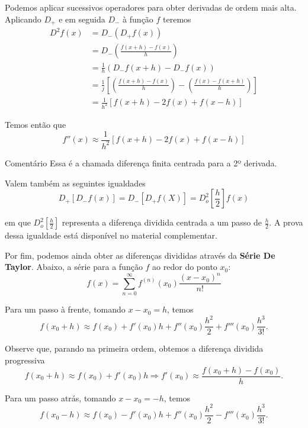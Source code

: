 \documentclass[12pt,openany]{book}
\begin{document}
Podemos aplicar sucessivos operadores para obter derivadas de ordem mais alta.
Aplicando $D_+$ e em seguida $D_-$ à função $f$ teremos
\[
    \begin{aligned}
        D^2f(x) &= D_-\left( D_+f(x) \right) \\
        &= D_-\left( \frac{f(x + h) - f(x)}{h} \right) \\
        &= \frac{1}{h}\left( D_-f(x + h) - D_-f(x) \right) \\
        &= \frac{1}{j}\left[ \left(\frac{f(x + h) - f(x)}{h}\right) - \left( \frac{f(x) - f(x + h)}{h} \right) \right] \\
        &= \frac{1}{h^2}\left[ f(x + h) - 2f(x) + f(x - h) \right]
    \end{aligned}
\]

Temos então que
\[
    f''(x) \approx \frac{1}{h^2}\left[ f(x + h) - 2f(x) + f(x - h) \right]
\]

\begin{remark}{Comentário}{}
    Essa é a chamada diferença finita centrada para a 2º derivada.
\end{remark}

Valem também as seguintes igualdades
\[
    D_+[D_-f(x)] = D_-[D_+f(X)] = D^2_o\left[ \frac{h}{2} \right]f(x)
\]

em que $D^2_o\left[\frac{h}{2}\right]$ representa a diferença dividida centrada a um passo de $\frac{h}{2}$.
A prova dessa igualdade está disponível no material complementar.

Por fim, podemos ainda obter as diferenças divididas através da \textbf{Série De Taylor}.
Abaixo, a série para a função $f$ ao redor do ponto $x_0$:
\[
f(x) = \sum_{n=0}^{\infty} f^{(n)}(x_0)\frac{(x - x_0)^n}{n!}
\]

Para um passo à frente, tomando $x - x_0 = h$, temos
\begin{equation}\label{cap_1:progressive_division_difference}
    f(x_0 + h) \approx f(x_0) + f'(x_0)h + f''(x_0)\frac{h^2}{2} + f'''(x_0)\frac{h^3}{3!}.
\end{equation}

Observe que, parando na primeira ordem, obtemos a diferença dividida progressiva
\[
    f(x_0 + h) \approx f(x_0) + f'(x_0)h \Rightarrow f'(x_0) \approx \frac{f(x_0 + h) - f(x_0)}{h}.
\]

Para um passo atrás, tomando $x - x_0 = -h$, temos
\begin{equation}\label{cap_1:regressive_division_difference}
    f(x_0 - h) \approx f(x_0) - f'(x_0)h + f''(x_0)\frac{h^2}{2} - f'''(x_0)\frac{h^3}{3!}.
\end{equation}
\end{document}
